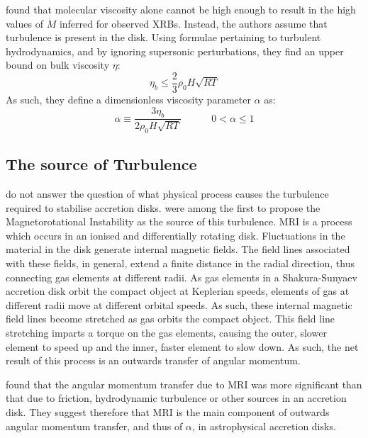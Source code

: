 \par \citet{Shakura_Disk} found that molecular viscosity alone cannot be high enough to result in the high values of $\dot{M}$ inferred for observed XRBs.  Instead, the authors assume that turbulence is present in the disk.  Using formulae pertaining to turbulent hydrodynamics, and by ignoring supersonic perturbations, they find an upper bound on bulk viscosity $\eta$:
\begin{equation}
\eta_b\leq\frac{2}{3}\rho_0H\sqrt{RT}
\end{equation}
As such, they define a dimensionless viscosity parameter $\alpha$ as:
\begin{equation}
\alpha\equiv\frac{3\eta_b}{2\rho_0H\sqrt{RT}}\quad\quad\quad0<\alpha\leq1
\end{equation}

\subsection{The source of Turbulence}

\par \citet{Shakura_Disk} do not answer the question of what physical process causes the turbulence required to stabilise accretion disks.  \citet{Balbus_MRI} were among the first to propose the Magnetorotational Instability \citep[MRI,][]{Velikhov_MRI,Chandrasekhar_MRI} as the source of this turbulence.  MRI is a process which occurs in an ionised and differentially rotating disk.  Fluctuations in the material in the disk generate internal magnetic fields.  The field lines associated with these fields, in general, extend a finite distance in the radial direction, thus connecting gas elements at different radii.  As gas elements in a Shakura-Sunyaev accretion disk orbit the compact object at Keplerian speeds, elements of gas at different radii move at different orbital speeds.  As such, these internal magnetic field lines become stretched as gas orbits the compact object.  This field line stretching imparts a torque on the gas elements, causing the outer, slower element to speed up and the inner, faster element to slow down.  As such, the net result of this process is an outwards transfer of angular momentum.
\par \citet{Balbus_MRI} found that the angular momentum transfer due to MRI was more significant than that due to friction, hydrodynamic turbulence or other sources in an accretion disk.  They suggest therefore that MRI is the main component of outwards angular momentum transfer, and thus of $\alpha$, in astrophysical accretion disks.

